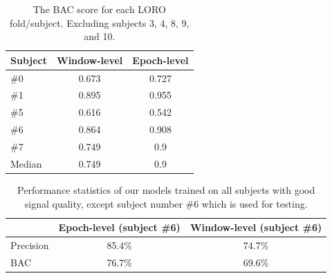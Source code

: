         \begin{table}[h]
            \centering
            \begin{tabular}{lcc}
            \toprule
                \textbf{Subject} & \textbf{Window-level} & \textbf{Epoch-level} \\
            \midrule
            \#0 & 0.673 & 0.727 \\
            \#1 & 0.895 & 0.955 \\
            \#5 & 0.616 & 0.542 \\
            \#6 & 0.864 & 0.908 \\
            \#7 & 0.749 & 0.9   \\
            \midrule
            Median & 0.749 & 0.9 \\
            \bottomrule
            \end{tabular}
            \caption{The BAC score for each LORO fold/subject. Excluding subjects 3, 4, 8, 9, and 10.}\label{table:bac-selective}
        \end{table}

        \begin{table}
            \begin{center}
                \begin{tabular}{lcc}
                  \toprule
                            & Epoch-level (subject \#6) & Window-level (subject \#6) \\
                  \midrule
                  Precision & 85.4\%                    & 74.7\% \\
                  BAC       & 76.7\%                    & 69.6\% \\
                  \bottomrule
                \end{tabular}
                \caption{Performance statistics of our models trained on all subjects with good signal quality, except subject number \#6 which is used for testing.}\label{fig:stats}
            \end{center}
        \end{table}

